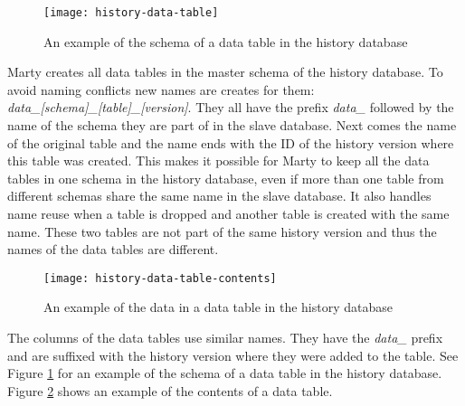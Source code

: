 \begin{figure}[h!]
  \centering
    \texttt{[image: history-data-table]}
  \caption{An example of the schema of a data table in the history database}
  \label{fig:history-data-table-2}
\end{figure}

Marty creates all data tables in the master schema of the history database.
To avoid naming conflicts new names are creates for them: \textit{data\_[schema]\_[table]\_[version]}.
They all have the prefix \textit{data\_} followed by the name of the schema they are part of in the slave database.
Next comes the name of the original table and the name ends with the ID of the history version where this table was created.
This makes it possible for Marty to keep all the data tables in one schema in the history database, even if more than one table from different schemas share the same name in the slave database.
It also handles name reuse when a table is dropped and another table is created with the same name.
These two tables are not part of the same history version and thus the names of the data tables are different.

\begin{figure}[h]
  \centering
    \texttt{[image: history-data-table-contents]}
  \caption{An example of the data in a data table in the history database}
  \label{fig:history-data-table-contents}
\end{figure}

The columns of the data tables use similar names.
They have the \textit{data\_} prefix and are suffixed with the history version where they were added to the table.
See Figure \ref{fig:history-data-table-2} for an example of the schema of a data table in the history database.
Figure \ref{fig:history-data-table-contents} shows an example of the contents of a data table.